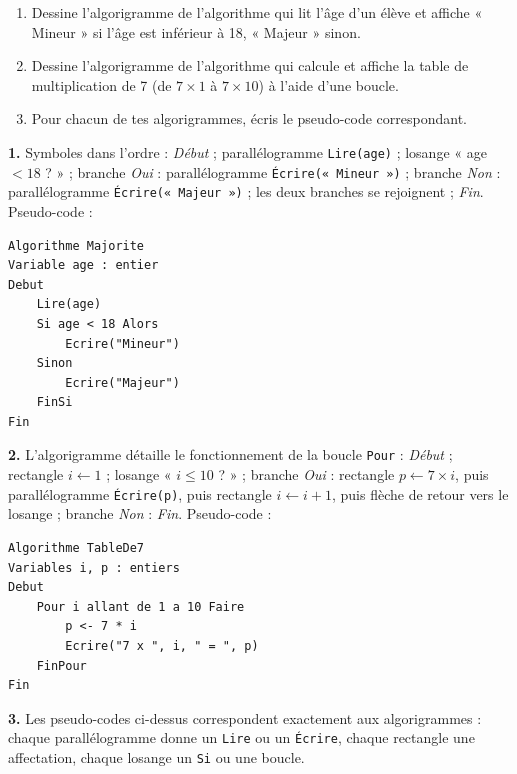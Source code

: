 \documentclass[11pt]{article}
\begin{document}
\begin{exercice}
\begin{enumerate}
  \item Dessine l'algorigramme de l'algorithme qui lit l'âge d'un élève et affiche « Mineur » si l'âge est inférieur à 18, « Majeur » sinon.
  \item Dessine l'algorigramme de l'algorithme qui calcule et affiche la table de multiplication de 7 (de $7 \times 1$ à $7 \times 10$) à l'aide d'une boucle.
  \item Pour chacun de tes algorigrammes, écris le pseudo-code correspondant.
\end{enumerate}
\end{exercice}

\begin{corrige}[Exercice]
\textbf{1.} Symboles dans l'ordre : \emph{Début} ; parallélogramme \texttt{Lire(age)} ; losange « age $< 18$ ? » ; branche \emph{Oui} : parallélogramme \texttt{Écrire(« Mineur »)} ; branche \emph{Non} : parallélogramme \texttt{Écrire(« Majeur »)} ; les deux branches se rejoignent ; \emph{Fin}. Pseudo-code :
\begin{lstlisting}
Algorithme Majorite
Variable age : entier
Debut
    Lire(age)
    Si age < 18 Alors
        Ecrire("Mineur")
    Sinon
        Ecrire("Majeur")
    FinSi
Fin
\end{lstlisting}
\textbf{2.} L'algorigramme détaille le fonctionnement de la boucle \texttt{Pour} : \emph{Début} ; rectangle $i \leftarrow 1$ ; losange « $i \leq 10$ ? » ; branche \emph{Oui} : rectangle $p \leftarrow 7 \times i$, puis parallélogramme \texttt{Écrire(p)}, puis rectangle $i \leftarrow i + 1$, puis flèche de retour vers le losange ; branche \emph{Non} : \emph{Fin}. Pseudo-code :
\begin{lstlisting}
Algorithme TableDe7
Variables i, p : entiers
Debut
    Pour i allant de 1 a 10 Faire
        p <- 7 * i
        Ecrire("7 x ", i, " = ", p)
    FinPour
Fin
\end{lstlisting}
\textbf{3.} Les pseudo-codes ci-dessus correspondent exactement aux algorigrammes : chaque parallélogramme donne un \texttt{Lire} ou un \texttt{Écrire}, chaque rectangle une affectation, chaque losange un \texttt{Si} ou une boucle.
\end{corrige}
\end{document}
